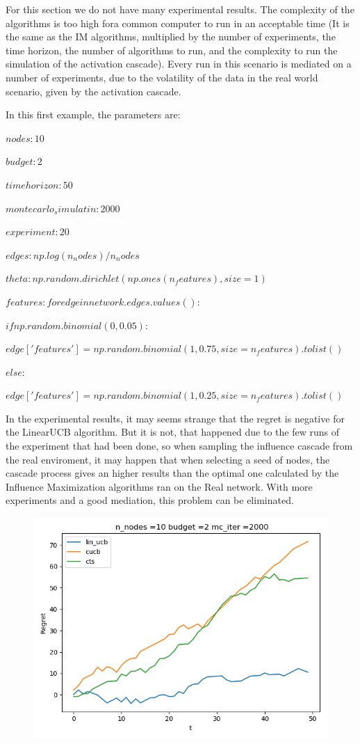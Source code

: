 For this section we do not have many experimental results.
The complexity of the algorithms is too high fora common computer to run in an acceptable time (It is the same as the IM algorithms, multiplied by the number of experiments, the time horizon, the number of algorithms to run, and the complexity to run the simulation of the activation cascade).
Every run in this scenario is mediated on a number of experiments, due to the volatility of the data in the real world scenario, given by the activation cascade.


In this first example, the parameters are:

$nodes: 10$

$budget: 2$

$time horizon: 50$

$montecarlo_simulatin: 2000$

$experiment: 20$

$edges: np.log(n_nodes) / n_nodes$

$theta: np.random.dirichlet(np.ones(n_features), size=1)$

$features: for edge in network.edges.values():$

$if np.random.binomial(0, 0.05):$

$edge['features'] = np.random.binomial(1, 0.75, size=n_features).tolist()$

$else:$

$edge['features'] = np.random.binomial(1, 0.25, size=n_features).tolist()$


In the experimental results, it may seems strange that the regret is negative for the LinearUCB algorithm.
But it is not, that happened due to the few runs of the experiment that had been done, so when sampling the influence cascade from the real enviroment, it may happen that when selecting a seed of nodes, the cascade process gives an higher results than the optimal one calculated by the Influence Maximization algorithms ran on the Real network.
With more experiments and a good mediation, this problem can be eliminated.



\begin{figure}[H]
	\centering
	\includegraphics[scale=0.6]{img/IMG5}
\end{figure}


